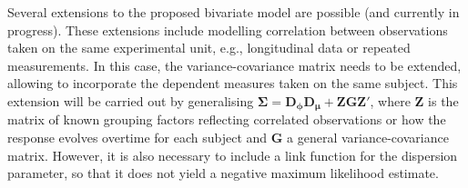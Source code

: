 \documentclass[useAMS,referee]{biom}
\begin{document}
Several extensions to the proposed bivariate model are possible (and currently in progress). These extensions include modelling correlation between observations taken on the same experimental unit, e.g., longitudinal data or repeated measurements. In this case, the variance-covariance matrix needs to be extended, allowing to incorporate the dependent measures taken on the same subject.  This extension will be carried out by generalising $\boldsymbol{\Sigma} = \mathbf{D_\phi D_\mu} + \mathbf{ZGZ'}$, where $\mathbf{Z}$ is the matrix of known grouping factors reflecting correlated observations or how the response evolves overtime for each subject and $\mathbf{G}$ a general variance-covariance matrix. However, it is also necessary to include a link function for the dispersion parameter, so that it does not yield a negative maximum likelihood estimate.

%
 








\appendix
\end{document}
